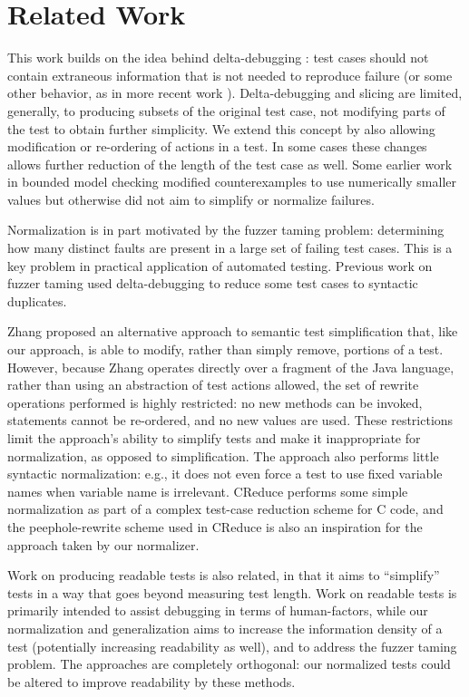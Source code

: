 \section{Related Work}

This work builds on the idea behind delta-debugging \cite{DD}: test
cases should not contain extraneous information that is not needed to
reproduce failure (or some other behavior, as in more recent work
\cite{icst2014,stvrcausereduce}).  Delta-debugging and slicing
\cite{TCminim} are limited, generally, to producing subsets of the
original test case, not modifying parts of the test to obtain further
simplicity.  We extend this concept by also allowing modification or
re-ordering of actions in a test.  In some cases these changes
allows further reduction of the length of the test case as well.  Some
earlier work in bounded model checking modified counterexamples to use
numerically smaller values \cite{MakeMost} but otherwise did not aim
to simplify or normalize failures.

Normalization is in part motivated by the fuzzer taming \cite{PLDI13}
problem: determining how many distinct faults are present in a large
set of failing test cases.  This is a key problem in practical
application of automated testing.  Previous work on fuzzer taming
\cite{PLDI13} used delta-debugging to reduce some test cases to
syntactic duplicates.

Zhang \cite{SaiSimple} proposed an alternative approach to semantic
test simplification that, like our approach, is able to modify, rather
than simply remove, portions of a test.  However, because Zhang
operates directly over a fragment of the Java language, rather than
using an abstraction of test actions allowed, the set of rewrite
operations performed is highly restricted: no new methods can be
invoked, statements cannot be re-ordered, and no new values are used.
These restrictions limit the approach's ability to simplify tests and
make it inappropriate for  normalization, as opposed to simplification.  The approach also performs little
syntactic normalization: e.g., it does not even force a test to use
fixed variable names when variable name is irrelevant.  CReduce
\cite{CReduce} performs some simple normalization as part of a complex
test-case reduction scheme for C code, and the peephole-rewrite scheme
used in CReduce is also an inspiration for the approach taken by our
normalizer.

Work on producing readable tests \cite{Guava,Readable} is also
related, in that it aims to ``simplify'' tests in a way that goes
beyond measuring test length.  Work on readable tests is primarily
intended to assist debugging in  terms of human-factors, while our
normalization and generalization aims to increase the information
density of a test (potentially increasing readability as well), and to address the fuzzer taming problem.  The approaches are
completely orthogonal: our normalized tests could be altered to
improve readability by these methods.

